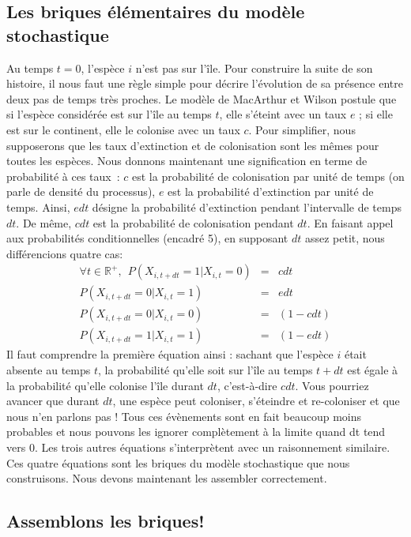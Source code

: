 \subsection{Les briques élémentaires du modèle stochastique}
Au temps $t=0$, l'espèce $i$ n'est pas sur l'île. Pour construire la suite de son histoire, il nous faut une règle simple pour décrire l'évolution de sa présence entre deux pas de temps très proches. Le modèle de MacArthur et Wilson postule que si l'espèce considérée est sur l'île au temps $t$, elle s'éteint avec un taux $e$ ; si elle est sur le continent, elle le colonise avec un taux $c$. Pour simplifier, nous supposerons que les taux d’extinction et de colonisation sont les mêmes pour toutes les espèces. Nous donnons maintenant une signification en terme de probabilité à ces taux~: $c$ est la probabilité de colonisation par unité de temps (on parle de densité du processus), $e$ est la probabilité d'extinction par unité de temps. Ainsi, $edt$ désigne la probabilité d'extinction pendant l'intervalle de temps $dt$. De même, $cdt$ est la probabilité de colonisation pendant $dt$. En faisant appel aux probabilités conditionnelles (encadré 5), en supposant $dt$ assez petit, nous différencions quatre cas:
\begin{eqnarray}
 \label{eqAnnI3a}  \forall t \in \mathbb{R}^+, ~~P(X_{i,t+dt}=1|X_{i,t}=0)&=&cdt\\
 \label{eqAnnI3b} P(X_{i,t+dt}=0|X_{i,t}=1)&=&edt \\
 \label{eqAnnI3c} P(X_{i,t+dt}=0|X_{i,t}=0)&=&(1-cdt) \\
   \label{eqAnnI3d} P(X_{i,t+dt}=1|X_{i,t}=1)&=&(1-edt)
\end{eqnarray}
Il faut comprendre la première équation ainsi : sachant que l'espèce $i$ était absente au temps $t$, la probabilité qu'elle soit sur l'île au temps $t+dt$ est égale à la probabilité qu'elle colonise l'île durant $dt$, c'est-à-dire $cdt$. Vous pourriez avancer que durant $dt$, une espèce peut coloniser, s'éteindre et re-coloniser et que nous n'en parlons pas ! Tous ces évènements sont en fait beaucoup moins probables et nous pouvons les ignorer complètement à la limite quand dt tend vers 0. Les trois autres équations s'interprètent avec un raisonnement similaire. Ces quatre équations sont les briques du modèle stochastique que nous construisons. Nous devons maintenant les assembler correctement.


\subsection{Assemblons les briques!}

